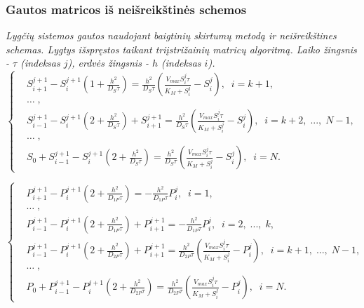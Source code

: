 \documentclass[12pt, a4paper, lithuanian]{article}
\begin{document}
\subsubsection{Gautos matricos iš neišreikštinės schemos}
\textit{Lygčių sistemos gautos naudojant baigtinių skirtumų metodą ir neišreikštines
schemas. Lygtys išspręstos taikant triįstrižainių matricų algoritmą. Laiko
žingsnis - $\tau$ (indeksas $j$), erdvės žingsnis - $h$ (indeksas $i$).}
\begin{equation}
\left\{
\begin{aligned}
    &S_{i+1}^{j+1}-S_i^{j+1}\left(1+\frac{h^2}{D_S\tau}\right)
= \frac{h^2}{D_S\tau} \left(\frac{V_{max}S_i^j\tau}{K_M+S_i^j}-S_i^j\right),\; \;
i = k +1,\\
    &\dots\;,\\
    &S_{i-1}^{j+1}-S_i^{j+1}\left(2+\frac{h^2}{D_S\tau}\right)+S_{i+1}^{j+1}
        = \frac{h^2}{D_S\tau}
        \left(\frac{V_{max}S_i^j\tau}{K_M+S_i^j}-S_i^j\right),\; \; i =
        k +2,\;...,\;N-1,\\
    &\dots\;,\\
    &S_0 + S_{i-1}^{j+1} - S_i^{j+1}\left(2+\frac{h^2}{D_S\tau}\right)
        =  \frac{h^2}{D_S\tau}
    \left(\frac{V_{max}S_i^j\tau}{K_M+S_i^j}-S_i^j\right),\; \; i = N.
\end{aligned}
\right.
\end{equation}

\begin{equation}
\left\{
\begin{aligned}
    &P_{i+1}^{j+1}-P_i^{j+1}\left(2+\frac{h^2}{D_{1P}\tau}\right)
    = -\frac{h^2}{D_{1P}\tau} P_i^j,\; \; i = 1,\\
    &\dots\;,\\
    &P_{i-1}^{j+1}-P_i^{j+1}\left(2+\frac{h^2}{D_{1P}\tau}\right)+P_{i+1}^{j+1}
    =-\frac{h^2}{D_{1P}\tau} P_i^j,\; \; i = 2,\;...,\;k,\\
    &P_{i-1}^{j+1}-P_i^{j+1}\left(2+\frac{h^2}{D_{2P}\tau}\right)+P_{i+1}^{j+1}
    = \frac{h^2}{D_{2P}\tau}
    \left(\frac{V_{max}S_i^j\tau}{K_M+S_i^j}-P_i^j\right),\; \; i =
        k +1,\;...,\;N-1,\\
    &\dots\;,\\
    &P_0 + P_{i-1}^{j+1} - P_i^{j+1}\left(2+\frac{h^2}{D_{2P}\tau}\right)
        =  \frac{h^2}{D_{2P}\tau}
        \left(\frac{V_{max}S_i^j\tau}{K_M+S_i^j}-P_i^j\right),\; \; i = N.
\end{aligned}
\right.
\end{equation}
\end{document}

